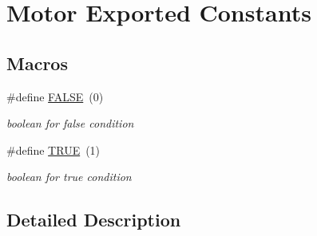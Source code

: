 \hypertarget{group___motor___exported___constants}{}\section{Motor Exported Constants}
\label{group___motor___exported___constants}
\subsection*{Macros}
\begin{DoxyCompactItemize}
\item 
\mbox{\label{group___motor___exported___constants_gaa93f0eb578d23995850d61f7d61c55c1}} 
\#define \mbox{\hyperlink{group___motor___exported___constants_gaa93f0eb578d23995850d61f7d61c55c1}{F\+A\+L\+SE}}~(0)
\begin{DoxyCompactList}\small\item\em boolean for false condition \end{DoxyCompactList}\item 
\mbox{\label{group___motor___exported___constants_gaa8cecfc5c5c054d2875c03e77b7be15d}} 
\#define \mbox{\hyperlink{group___motor___exported___constants_gaa8cecfc5c5c054d2875c03e77b7be15d}{T\+R\+UE}}~(1)
\begin{DoxyCompactList}\small\item\em boolean for true condition \end{DoxyCompactList}\end{DoxyCompactItemize}


\subsection{Detailed Description}
